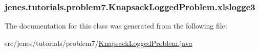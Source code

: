 \hypertarget{classjenes_1_1tutorials_1_1problem7_1_1_knapsack_logged_problem_a3a30daf2350f661a57bd3c176a5b1f2f}{
\subsubsection[{xlslogge3}]{ jenes.\-tutorials.\-problem7.\-Knapsack\-Logged\-Problem.\-xlslogge3\hspace{0.3cm}{\ttfamily [private]}}}\label{classjenes_1_1tutorials_1_1problem7_1_1_knapsack_logged_problem_a3a30daf2350f661a57bd3c176a5b1f2f}


The documentation for this class was generated from the following file\-:\begin{DoxyCompactItemize}
\item 
src/jenes/tutorials/problem7/\hyperlink{problem7_2_knapsack_logged_problem_8java}{Knapsack\-Logged\-Problem.\-java}\end{DoxyCompactItemize}
